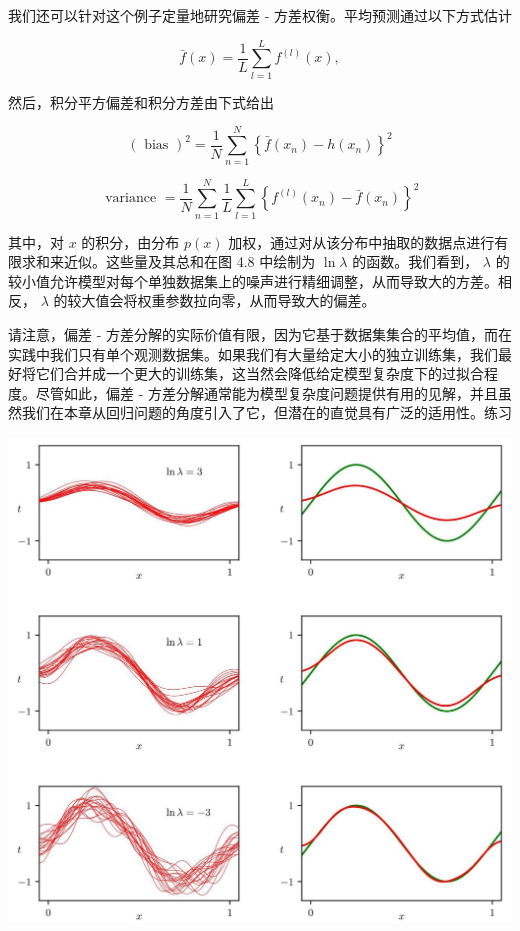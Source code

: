 \documentclass[10pt]{report}
\begin{document}
我们还可以针对这个例子定量地研究偏差 - 方差权衡。平均预测通过以下方式估计

\[
\bar{f}\left( x\right)  = \frac{1}{L}\mathop{\sum }\limits_{{l = 1}}^{L}{f}^{\left( l\right) }\left( x\right) , \tag{4.50}
\]

然后，积分平方偏差和积分方差由下式给出

\[
{\left( \text{ bias }\right) }^{2} = \frac{1}{N}\mathop{\sum }\limits_{{n = 1}}^{N}{\left\{  \bar{f}\left( {x}_{n}\right)  - h\left( {x}_{n}\right) \right\}  }^{2} \tag{4.51}
\]

\[
\text{ variance } = \frac{1}{N}\mathop{\sum }\limits_{{n = 1}}^{N}\frac{1}{L}\mathop{\sum }\limits_{{l = 1}}^{L}{\left\{  {f}^{\left( l\right) }\left( {x}_{n}\right)  - \bar{f}\left( {x}_{n}\right) \right\}  }^{2} \tag{4.52}
\]

其中，对 \(x\) 的积分，由分布 \(p\left( x\right)\) 加权，通过对从该分布中抽取的数据点进行有限求和来近似。这些量及其总和在图 4.8 中绘制为 \(\ln \lambda\) 的函数。我们看到， \(\lambda\) 的较小值允许模型对每个单独数据集上的噪声进行精细调整，从而导致大的方差。相反， \(\lambda\) 的较大值会将权重参数拉向零，从而导致大的偏差。

请注意，偏差 - 方差分解的实际价值有限，因为它基于数据集集合的平均值，而在实践中我们只有单个观测数据集。如果我们有大量给定大小的独立训练集，我们最好将它们合并成一个更大的训练集，这当然会降低给定模型复杂度下的过拟合程度。尽管如此，偏差 - 方差分解通常能为模型复杂度问题提供有用的见解，并且虽然我们在本章从回归问题的角度引入了它，但潜在的直觉具有广泛的适用性。练习

\begin{center}
\includegraphics[max width=1.0\textwidth]{images/0194e279-9b28-703a-88f4-c3ac21e2010d_146_232_425_1333_1286_0.jpg}
\end{center}
\hspace*{3em} 
\end{document}
